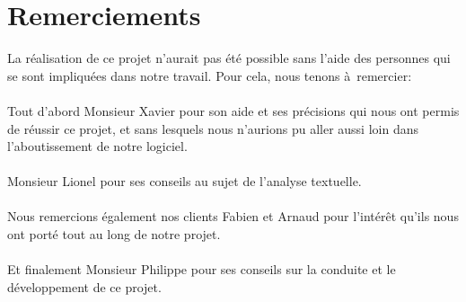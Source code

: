 \chapter*{Remerciements}
La réalisation de ce projet n'aurait pas été possible sans l'aide des personnes qui se sont impliquées dans notre travail. Pour cela, nous tenons à remercier:\\\\

Tout d'abord Monsieur Xavier  pour son aide et ses précisions qui nous ont permis de réussir ce projet, et sans lesquels nous n'aurions pu aller aussi loin dans l'aboutissement de notre logiciel.\\\\
Monsieur Lionel  pour ses conseils au sujet de l'analyse textuelle.\\\\
Nous remercions également nos clients Fabien  et Arnaud  pour l'intérêt qu'ils nous ont porté tout au long de notre projet.\\\\
Et finalement Monsieur Philippe  pour ses conseils sur la conduite et le développement de ce projet.